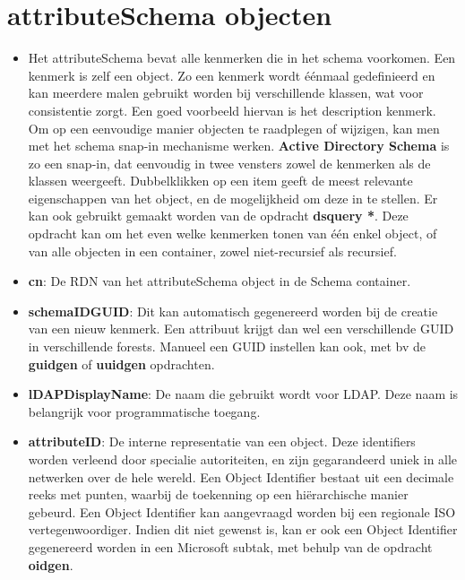 \documentclass{report}
\begin{document}
	\section{attributeSchema objecten }
	\begin{enumerate}
		 { 
			\begin{itemize}
				\item Het attributeSchema bevat alle kenmerken die in het schema voorkomen. Een kenmerk is zelf een object. Zo een kenmerk wordt éénmaal gedefinieerd en kan meerdere malen gebruikt worden bij verschillende klassen, wat voor consistentie zorgt. Een goed voorbeeld hiervan is het description kenmerk. Om op een eenvoudige manier objecten te raadplegen of wijzigen, kan men met het schema snap-in mechanisme werken. \textbf{Active Directory Schema} is zo een snap-in, dat eenvoudig in twee vensters zowel de kenmerken als de klassen weergeeft. Dubbelklikken op een item geeft de meest relevante eigenschappen van het object, en de mogelijkheid om deze in te stellen. Er kan ook gebruikt gemaakt worden van de opdracht \textbf{dsquery *}. Deze opdracht kan om het even welke kenmerken tonen van één enkel object, of van alle objecten in een container, zowel niet-recursief als recursief.
			\end{itemize}
		}
		
		 { 
			\begin{itemize}
				\item \textbf{cn}: De RDN van het attributeSchema object in de Schema container.
				\item \textbf{schemaIDGUID}: Dit kan automatisch gegenereerd worden bij de creatie van een nieuw kenmerk. Een attribuut krijgt dan wel een verschillende GUID in verschillende forests. Manueel een GUID instellen kan ook, met bv de \textbf{guidgen} of \textbf{uuidgen} opdrachten.
				\item \textbf{lDAPDisplayName}: De naam die gebruikt wordt voor LDAP. Deze naam is belangrijk voor programmatische toegang.
				\item \textbf{attributeID}: De interne representatie van een object. Deze identifiers worden verleend door specialie autoriteiten, en zijn gegarandeerd uniek in alle netwerken over de hele wereld. Een Object Identifier bestaat uit een decimale reeks met punten, waarbij de toekenning op een hiërarchische manier gebeurd. Een Object Identifier kan aangevraagd worden bij een regionale ISO vertegenwoordiger. Indien dit niet gewenst is, kan er ook een Object Identifier gegenereerd worden in een Microsoft subtak, met behulp van de opdracht \textbf{oidgen}.
			\end{itemize}
		}
		

\end{enumerate}
\end{document}
